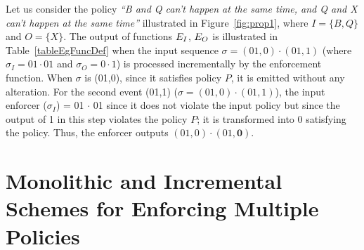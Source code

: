 \begin{example}
	\label{eg:funcDef}
	Let us consider the policy \textit{``B and Q can't happen at the same time, and Q and X can't happen at the same time''} illustrated in Figure~\ref{fig:prop1}, where $I= \{B,Q\}$ and $O=\{ X \}$.
	The output of functions $E_{I}$, $E_{O}$ is illustrated in Table~\ref{tableEgFuncDef} when the input sequence $\sigma = (01,0)\cdot(01,1)$ (where $\sigma_I = 01\cdot01$ and $\sigma_O= 0\cdot1$) is processed incrementally by the enforcement function. When $\sigma$ is (01,0), since it satisfies policy $P$, it is emitted without any alteration. For the second event  (01,1) ($\sigma = (01,0)\cdot(01,1)$), the input enforcer \efi({$\sigma_{I}$}) = 01 $\cdot$ 01 since it does not violate the input policy but since the output of 1 in this step violates the policy $P$; it is transformed into 0 satisfying the policy. Thus, the enforcer outputs $(01,0)\cdot(01,\textbf{0})$.
\end{example}

\section{Monolithic and Incremental Schemes for Enforcing Multiple Policies}
\label{sec:composition}

